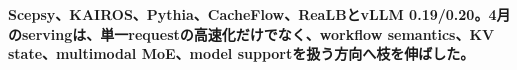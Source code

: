 \noindent\textbf{Scepsy、KAIROS、Pythia、CacheFlow、ReaLBとvLLM 0.19/0.20。4月のservingは、単一requestの高速化だけでなく、workflow semantics、KV state、multimodal MoE、model supportを扱う方向へ枝を伸ばした。}\autocite{src-0fc9d11483aa,src-2a6eae37bd39,src-551442a9e215,src-b790ec92aa01,src-d91793d0a6fa,src-e1e959857ced,src-fe12f92c05d7}

